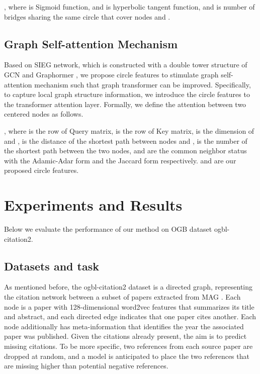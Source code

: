 \documentclass[sigconf]{acmart}
\begin{document}
, where  is Sigmoid function, and  is hyperbolic tangent function, and  is number of bridges sharing the same circle that cover nodes  and .

\subsection{Graph Self-attention Mechanism}
Based on SIEG\citep{sieg2023} network, which is constructed with a double tower structure of GCN\citep{kipf2016semi} and Graphormer \citep{ying2106transformers}, we propose circle features to stimulate graph self-attention mechanism such that graph transformer can be improved.
Specifically, to capture local graph structure information, we introduce the circle features to the transformer attention layer. Formally, we define the attention between two centered nodes as follows.

, where  is the  row of Query matrix,  is the  row of Key matrix,  is the dimension of  and ,  is the distance of the shortest path between nodes  and ,  is the number of the shortest path between the two nodes,  and  are the common neighbor status with the Adamic-Adar form and the Jaccard form respectively.  and  are our proposed circle features.







\section{Experiments and Results}
\label{sec:exp}
Below we evaluate the performance of our method on OGB dataset ogbl-citation2\citep{hu2020ogb}.

\subsection{Datasets and task} As mentioned before, the ogbl-citation2 dataset is a directed graph, representing the citation network between a subset of papers extracted from MAG \citep{wang2020microsoft}. Each node is a paper with 128-dimensional word2vec features \citep{mikolov2013distributed} that summarizes its title and abstract, and each directed edge indicates that one paper cites another. Each node additionally has meta-information that identifies the year the associated paper was published. Given the citations already present, the aim is to predict missing citations. To be more specific, two references from each source paper are dropped at random, and a model is anticipated to place the two references that are missing higher than potential negative references.
\end{document}
